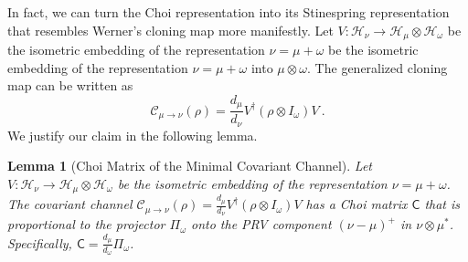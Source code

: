 \documentclass[11pt,letterpaper]{article}
\newtheorem{lem}{Lemma}
\begin{document}
In fact, we can turn the Choi representation into its Stinespring representation that resembles Werner's cloning map more manifestly. Let $V: \mathcal{H}_\nu \to \mathcal{H}_\mu \otimes \mathcal{H}_\omega$ be the isometric embedding of the representation $\nu = \mu + \omega$ be the isometric embedding of the representation $\nu = \mu + \omega$ into $\mu\otimes\omega$. The generalized cloning map can be written as
\begin{equation}
    \mathcal{C}_{\mu \to \nu}(\rho) = \frac{d_\mu}{d_\nu} V^\dagger (\rho \otimes I_\omega) V\ .
\end{equation}
We justify our claim in the following lemma.
\begin{lem}[Choi Matrix of the Minimal Covariant Channel]\label{lem:choi_prv}
    Let $V: \mathcal{H}_\nu \to \mathcal{H}_\mu \otimes \mathcal{H}_\omega$ be the isometric embedding of the representation $\nu = \mu + \omega$. The covariant channel $\mathcal{C}_{\mu \to \nu}(\rho) = \frac{d_\mu}{d_\nu} V^\dagger (\rho \otimes I_\omega) V$ has a Choi matrix $\mathsf{C}$ that is proportional to the projector $\Pi_\omega$ onto the PRV component $(\nu - \mu)^+$ in $\nu \otimes \mu^*$. Specifically, $\mathsf{C} = \frac{d_\mu}{d_\omega} \Pi_\omega$.
\end{lem}
\end{document}
